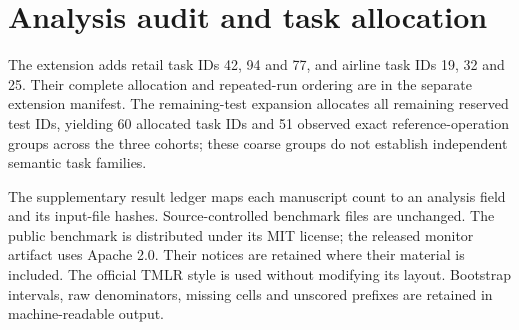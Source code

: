 \documentclass[10pt]{article}
\begin{document}
\section{Analysis audit and task allocation}

The extension adds retail task IDs 42, 94 and 77, and airline task IDs 19, 32 and 25. Their complete allocation and repeated-run ordering are in the separate extension manifest. The remaining-test expansion allocates all remaining reserved test IDs, yielding 60 allocated task IDs and 51 observed exact reference-operation groups across the three cohorts; these coarse groups do not establish independent semantic task families.

The supplementary result ledger maps each manuscript count to an analysis field and its input-file hashes. Source-controlled benchmark files are unchanged. The public benchmark is distributed under its MIT license; the released monitor artifact uses Apache 2.0. Their notices are retained where their material is included. The official TMLR style is used without modifying its layout. Bootstrap intervals, raw denominators, missing cells and unscored prefixes are retained in machine-readable output.
\clearpage

\end{document}
